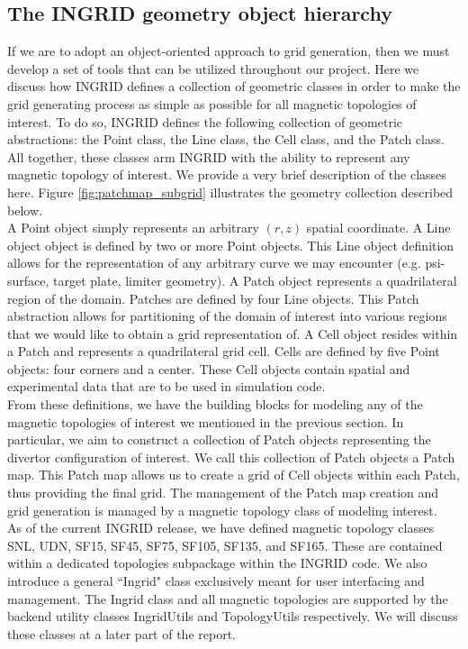 \subsection{\label{sec:label2}The INGRID geometry object hierarchy}
If we are to adopt an object-oriented approach to grid generation, then we must develop a set of tools that can be utilized throughout our project. Here we discuss how INGRID defines a collection of geometric classes in order to make the grid generating process as simple as possible for all magnetic topologies of interest. To do so, INGRID defines the following collection of geometric abstractions: the Point class, the Line class, the Cell class, and the Patch class. All together, these classes arm INGRID with the ability to represent any magnetic topology of interest. We provide a very brief description of the classes here. Figure \ref{fig:patchmap_subgrid} illustrates the geometry collection described below.\\
\indent
A Point object simply represents an arbitrary $(r,z)$ spatial coordinate. A Line object object is defined by two or more Point objects. This Line object definition allows for the representation of any arbitrary curve we may encounter (e.g. psi-surface, target plate, limiter geometry). A Patch object represents a quadrilateral region of the domain. Patches are defined by four Line objects. This Patch abstraction allows for partitioning of the domain of interest into various regions that we would like to obtain a grid representation of. A Cell object resides within a Patch and represents a quadrilateral grid cell. Cells are defined by five Point objects: four corners and a center. These Cell objects contain spatial and experimental data that are to be used in simulation code.\\ \indent
From these definitions, we have the building blocks for modeling any of the magnetic topologies of interest we mentioned in the previous section. In particular, we aim to construct a collection of Patch objects representing the divertor configuration of interest. We call this collection of Patch objects a Patch map. This Patch map allows us to create a grid of Cell objects within each Patch, thus providing the final grid. The management of the Patch map creation and grid generation is managed by a magnetic topology class of modeling interest. \\ \indent
As of the current INGRID release, we have defined magnetic topology classes SNL, UDN, SF15, SF45, SF75, SF105, SF135, and SF165. These are contained within a dedicated topologies subpackage within the INGRID code. We also introduce a general ``Ingrid" class exclusively meant for user interfacing and management. The Ingrid class and all magnetic topologies are supported by the backend utility classes IngridUtils and TopologyUtils respectively. We will discuss these classes at a later part of the report.
